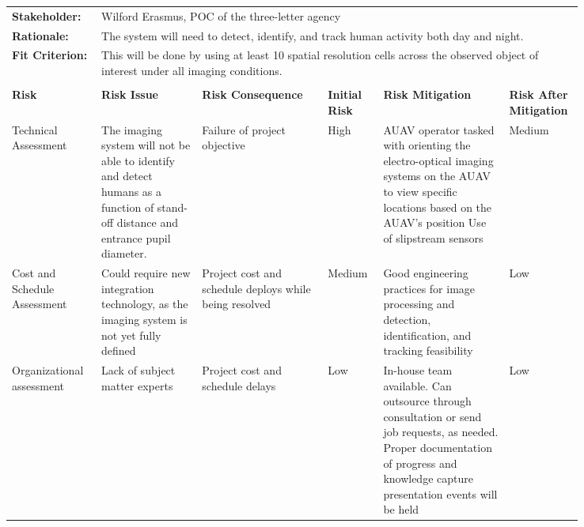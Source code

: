 \begin{landscape}
{\fontsize{8pt}{8pt}\selectfont
\begin{longtable}{| p{0.12\linewidth} | p{0.16\linewidth} |  p{0.20\linewidth} | p{0.08\linewidth} | p{0.20\linewidth} | p{0.08\linewidth} |}
	\hline \endlastfoot
	
	\hline
	\rowcolor[gray]{0.8}
	\multicolumn{6}{|c|}{ } \\
	\hline
	\textbf{Stakeholder:} & \multicolumn{5}{|l|}{Wilford Erasmus, POC of the three-letter agency} \\
	\hline
	\textbf{Rationale:} & \multicolumn{5}{|l|}{The system will need to detect, identify, and track human activity both day and night.} \\
	\hline
	\textbf{Fit Criterion:} & \multicolumn{5}{|p{0.8\linewidth}|}{This will be done by using at least 10 spatial resolution cells across the observed object of interest under all imaging conditions.} \\
	\hline
	\rowcolor[gray]{0.8}
	\multicolumn{6}{|c|}{ } \\
	\hline
	\textbf{Risk} & \textbf{Risk Issue} & \textbf{Risk Consequence} & \textbf{Initial Risk} & \textbf{Risk Mitigation} & \textbf{Risk \newline After Mitigation} \\
	\hline
	Technical \newline Assessment & The imaging system will not be able to identify and detect humans as a function of stand-off distance and entrance pupil diameter. & Failure of project objective & \cellcolor{red} High & AUAV operator tasked with orienting the electro-optical imaging systems on the AUAV to view specific locations based on the AUAV's position \newline Use of slipstream sensors & \cellcolor{yellow} Medium \\
	\hline
	Cost and Schedule \newline Assessment & Could require new integration technology, as the imaging system is not yet fully defined & Project cost and schedule deploys while being resolved & \cellcolor{yellow} Medium & Good engineering practices for image processing and detection, identification, and tracking feasibility & \cellcolor{green} Low \\
	\hline
	Organizational assessment & Lack of subject matter experts & Project cost and schedule delays & \cellcolor{green} Low & In-house team available. \newline Can outsource through consultation or send job requests, as needed. \newline Proper documentation of progress and knowledge capture presentation events will be held & \cellcolor{green} Low \\

\end{longtable}}
\end{landscape}
